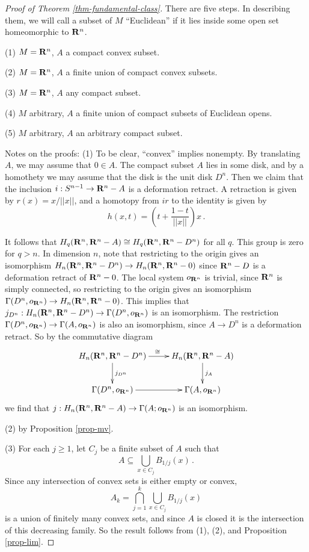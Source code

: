 \begin{proof}[Proof of Theorem \ref{thm-fundamental-class}] 
There are five steps. In describing them, we will call a subset of $M$
``Euclidean'' if it lies inside some open set homeomorphic to $\mathbf R^n$.

\smallskip
\noindent
(1) $M=\mathbf R^n$, $A$ a compact convex subset.

\noindent
(2) $M=\mathbf R^n$, $A$ a finite union of compact convex subsets.

\noindent
(3) $M=\mathbf R^n$, $A$ any compact subset.

\noindent
(4) $M$ arbitrary, $A$ a finite union of compact subsets of Euclidean opens.

\noindent
(5) $M$ arbitrary, $A$ an arbitrary compact subset. 

\smallskip
Notes on the proofs: (1) To be clear, ``convex'' implies nonempty. 
By translating $A$, we may assume that $0\in A$. The compact subset $A$
lies in some disk, and by a homothety we may assume that the disk is the
unit disk $D^n$. Then we claim that the inclusion $i:S^{n-1}\to\mathbf R^n-A$
is a deformation retract. A retraction is given by $r(x)=x/||x||$, 
and a homotopy from $ir$ to the identity is given by 
\[
h(x,t)=\left(t+\frac{1-t}{||x||}\right)x\,.
\]

It follows that $H_q(\mathbf R^n,\mathbf R^n-A)\cong H_q(\mathbf R^n,\mathbf R^n-D^n)$ for all
$q$. This group is zero for $q>n$. In dimension $n$, note that restricting
to the origin gives an isomorphism 
$H_n(\mathbf R^n,\mathbf R^n-D^n)\to H_n(\mathbf R^n,\mathbf R^n-0)$ since 
$\mathbf R^n-D$ is a deformation retract of $\mathbf R^n-0$. The local system $o_{\mathbf R^n}$ 
is trivial, since $\mathbf R^n$ is simply connected, so restricting to the origin
gives an isomorphism $\Gamma(D^n,o_{\mathbf R^n})\to H_n(\mathbf R^n,\mathbf R^n-0)$. 
This implies that $j_{D^n}:H_n(\mathbf R^n,\mathbf R^n-D^n)\to\Gamma(D^n,o_{\mathbf R^n})$
is an isomorphism. The restriction 
$\Gamma(D^n,o_{\mathbf R^n})\to\Gamma(A,o_{\mathbf R^n})$ is also an isomorphism, since
$A\to D^n$ is a deformation retract. So by the commutative diagram
\[
\xymatrix{
H_n(\RR^n,\RR^n-D^n) \ar[r]^\cong \ar[d]^{j_{D^n}} & 
H_n(\RR^n,\RR^n-A) \ar[d]^{j_A} \\
\Gamma(D^n,o_{\RR^n}) \ar[r] & \Gamma(A,o_{\RR^n}) 
}\]
we find that $j:H_n(\mathbf R^n,\mathbf R^n-A)\to\Gamma(A;o_{\mathbf R^n})$ is an isomorphism.

(2) by Proposition \ref{prop-mv}. 

(3) For each $j\geq1$, let $C_j$ be a finite subset of $A$ such that 
\[
A\subseteq \bigcup_{x\in C_j}B_{1/j}(x)\,.
\]
Since any intersection of convex sets is either empty or convex, 
\[
A_k=\bigcap_{j=1}^k\bigcup_{x\in C_j}B_{1/j}(x)
\]
is a union of finitely many convex sets, and since $A$ is closed
it is the intersection of this decreasing family. So the result
follows from (1), (2), and Proposition \ref{prop-lim}.


\end{proof}
